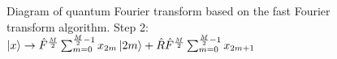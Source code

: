 \begin{figure}
\centering



\caption{Diagram of quantum Fourier transform based on the fast Fourier transform algorithm. Step 2: 
$\ket{x} \rightarrow
\hat{F}^{\frac{M}{2}} \sum_{m = 0}^{\frac{M}{2} - 1}x_{2m} \ket{2m} +
\hat{R}\hat{F}^{\frac{M}{2}} \sum_{m = 0}^{\frac{M}{2} - 1} x_{2m + 1}$}
\label{figQuantCompQuantFourier2}
\end{figure}
